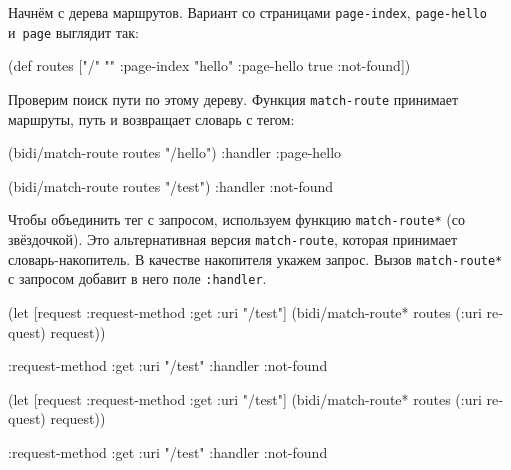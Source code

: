 \fi

Начнём с дерева маршрутов. Вариант со страницами \texttt{page\--index},
\texttt{page\--hello} и~\texttt{page} выглядит так:

\begin{english}
  \begin{clojure}
(def routes
  ["/" {""      :page-index
        "hello" :page-hello
        true    :not-found}])
  \end{clojure}
\end{english}


Проверим поиск пути по этому дереву. Функция \verb|match-route| принимает
маршруты, путь и возвращает словарь с тегом:

\begin{english}
  \begin{clojure}
(bidi/match-route routes "/hello")
{:handler :page-hello}

(bidi/match-route routes "/test")
{:handler :not-found}
  \end{clojure}
\end{english}


Чтобы объединить тег с запросом, используем функцию \texttt{match\--route*} (со
звёздочкой). Это альтернативная версия \texttt{match\--route}, которая принимает
словарь-накопитель. В качестве накопителя укажем запрос. Вызов
\verb|match-route*| с запросом добавит в него поле \verb|:handler|.

\ifnarrow

\begin{english}
  \begin{clojure}
(let [request {:request-method :get
               :uri "/test"}]
  (bidi/match-route*
    routes (:uri request) request))

{:request-method :get
 :uri "/test"
 :handler :not-found}
  \end{clojure}
\end{english}

\else

\begin{english}
  \begin{clojure}
(let [request {:request-method :get
               :uri "/test"}]
  (bidi/match-route* routes (:uri request) request))

{:request-method :get
 :uri "/test"
 :handler :not-found}
  \end{clojure}
\end{english}

